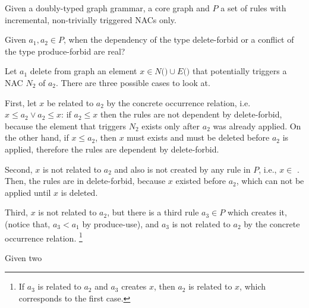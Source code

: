 \begin{definition}[Sketch] Given \doublyTypedGraphGrammarCore{} a doubly-typed graph grammar, \coreGraph{} a core graph and $P$ a set of rules with incremental, non-trivially triggered NACs only.

Given $a_1, a_2 \in P$, when the dependency of the type delete-forbid or a conflict of the type produce-forbid are real?

Let $a_1$ delete from graph \coreGraph{} an element $x \in N($\coreGraph$) \cup E($\coreGraph$)$ that potentially triggers a NAC $N_2$ of $a_2$. There are three possible cases to look at. 
  
  First, let $x$ be related to $a_2$ by the concrete occurrence relation, i.e. \mbox{$x \leq a_2 \lor a_2 \leq x$}: if $a_2 \leq x$ then the rules are not dependent by delete-forbid, because the element that triggers $N_2$ exists only after $a_2$ was already applied. On the other hand, if $x \leq a_2$, then $x$ must exists and must be deleted before $a_2$ is applied, therefore the rules are dependent by delete-forbid.

Second, $x$ is not related to $a_2$ and also is not created by any rule in $P$, i.e., $x \in$ \coreGraph{}. Then, the rules are in delete-forbid, because $x$ existed before $a_2$, which can not be applied until $x$ is deleted.

  Third, $x$ is not related to $a_2$, but there is a third rule $a_3 \in P$ which creates it, (notice that, $a_3 < a_1$ by produce-use), and $a_3$ is not related to $a_2$ by the concrete occurrence relation. \footnote{If $a_3$ is related to $a_2$ and $a_3$ creates $x$, then $a_2$ is related to $x$, which corresponds to the first case.}
\end{definition}

\begin{definition} Given two


\end{definition}

\begin{definition}
\end{definition}


